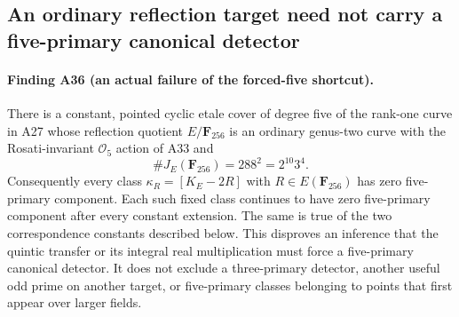 \subsection{An ordinary reflection target need not carry a five-primary canonical detector}

\paragraph{Finding A36 (an actual failure of the forced-five shortcut).}
There is a constant, pointed cyclic etale cover of degree five of the
rank-one curve in A27 whose reflection quotient $E/\mathbf F_{256}$
is an ordinary genus-two curve with the Rosati-invariant
$\mathcal O_5$ action of A33 and
\[
 \#J_E(\mathbf F_{256})=288^2=2^{10}3^4.
 \tag{NF.1}
\]
Consequently every class $\kappa_R=[K_E-2R]$ with
$R\in E(\mathbf F_{256})$ has zero five-primary component.
Each such fixed class continues to have zero five-primary component
after every constant extension. The same is true of the two
correspondence constants described below. This disproves an inference
that the quintic transfer or its integral real multiplication must
force a five-primary canonical detector. It does not exclude a
three-primary detector, another useful odd prime on another target,
or five-primary classes belonging to points that first appear over
larger fields.

